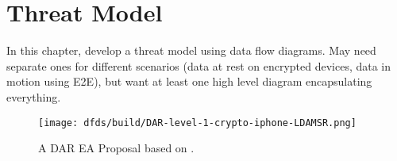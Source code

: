 \chapter{Threat Model}
\label{chap-threatmodel}

In this chapter, develop a threat model using data flow diagrams. May need separate ones for different scenarios (data
at rest on encrypted devices, data in motion using E2E), but want at least one high level diagram encapsulating
everything.

\begin{figure}[h]
    \centering\CaptionFontSize
    \texttt{[image: dfds/build/DAR-level-1-crypto-iphone-LDAMSR.png]}
    \caption[A DAR EA Proposal]{A DAR EA Proposal based on \cite{savage_lawful_2018}.}
    \label{fig-dfd-lawful}
\end{figure}



